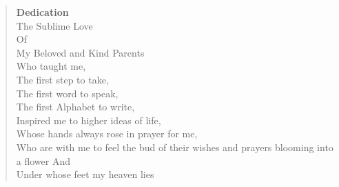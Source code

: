 \vspace*{\fill} 
\begin{quote} 
\centering 
\begin{center}
\textbf{\huge Dedication}\\
The Sublime Love\\
Of\\
My Beloved and Kind Parents\\
Who taught me,\\
The first step to take,\\
The first word to speak,\\
The first Alphabet to write,\\
Inspired me to higher ideas of life,\\
Whose hands always rose in prayer for me,\\
Who are with me to feel the bud of their wishes and prayers blooming into a flower
And\\
Under whose feet my heaven lies
\end{center}
\vspace*{\fill}
\end{quote}

